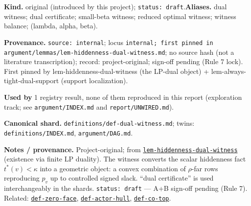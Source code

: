 \begin{defnote}
\textbf{Kind.} original (introduced by this project); \texttt{status: draft}.\quad\textbf{Aliases.} dual witness; dual certificate; small-beta witness; reduced optimal witness; witness balance; (lambda, alpha, beta).
\par
\textbf{Provenance.} \texttt{source: internal}; locus \texttt{internal;\allowbreak{} first pinned in argument/\allowbreak{}lemmas/\allowbreak{}lem-\allowbreak{}hiddenness-\allowbreak{}dual-\allowbreak{}witness.\allowbreak{}md}; no source hash (not a literature transcription); record: project-\allowbreak{}original;\allowbreak{} sign-\allowbreak{}off pending (Rule 7 lock).\allowbreak{} First pinned by lem-\allowbreak{}hiddenness-\allowbreak{}dual-\allowbreak{}witness (the LP-\allowbreak{}dual object) + lem-\allowbreak{}always-\allowbreak{}tight-\allowbreak{}dual-\allowbreak{}support (support localization).
\par
\textbf{Used by} 1 registry result, none of them reproduced in this report (exploration track; see \texttt{argument/INDEX.md} and \texttt{report/UNWIRED.md}).
\par
\textbf{Canonical shard.} \texttt{definitions/\allowbreak{}def-\allowbreak{}dual-\allowbreak{}witness.\allowbreak{}md}; twins: \texttt{definitions/INDEX.md}, \texttt{argument/DAG.md}.
\par
\textbf{Notes / provenance.} Project-original; from \hyperlink{dag:lem-hiddenness-dual-witness}{\texttt{lem-\allowbreak{}hiddenness-\allowbreak{}dual-\allowbreak{}witness}} (existence via finite
LP duality). The witness converts the scalar hiddenness fact $t^*(v)<\kappa$ into a geometric object:
a convex combination of $\rho$-far rows reproducing $p_v$ up to controlled signed slack. ``dual
certificate'' is used interchangeably in the shards. \texttt{status:\allowbreak{} draft} --- A+B sign-off pending (Rule 7).
Related: \hyperref[def:zero-face]{\texttt{def-\allowbreak{}zero-\allowbreak{}face}}, \hyperref[def:actor-hull]{\texttt{def-\allowbreak{}actor-\allowbreak{}hull}}, \hyperref[def:co-top]{\texttt{def-\allowbreak{}co-\allowbreak{}top}}.
\end{defnote}

